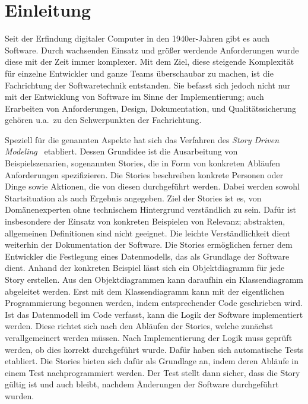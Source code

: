 \chapter{Einleitung}\label{ch:introduction}

Seit der Erfindung digitaler Computer in den 1940er-Jahren gibt es auch Software.
Durch wachsenden Einsatz und größer werdende Anforderungen wurde diese mit der Zeit immer komplexer.
Mit dem Ziel, diese steigende Komplexität für einzelne Entwickler und ganze Teams überschaubar zu machen, ist die Fachrichtung der Softwaretechnik entstanden.
Sie befasst sich jedoch nicht nur mit der Entwicklung von Software im Sinne der Implementierung;
auch Erarbeiten von Anforderungen, Design, Dokumentation, und Qualitätssicherung gehören u.a.\ zu den Schwerpunkten der Fachrichtung.

Speziell für die genannten Aspekte hat sich das Verfahren des \emph{Story Driven Modeling}~\cite{sdm} etabliert.
Dessen Grundidee ist die Ausarbeitung von Beispielszenarien, sogenannten Stories, die in Form von konkreten Abläufen Anforderungen spezifizieren.
Die Stories beschreiben konkrete Personen oder Dinge sowie Aktionen, die von diesen durchgeführt werden.
Dabei werden sowohl Startsituation als auch Ergebnis angegeben.
Ziel der Stories ist es, von Domänenexperten ohne technischem Hintergrund verständlich zu sein.
Dafür ist insbesondere der Einsatz von konkreten Beispielen von Relevanz;
abstrakten, allgemeinen Definitionen sind nicht geeignet.
Die leichte Verständlichkeit dient weiterhin der Dokumentation der Software.
Die Stories ermöglichen ferner dem Entwickler die Festlegung eines Datenmodells, das als Grundlage der Software dient.
Anhand der konkreten Beispiel lässt sich ein Objektdiagramm für jede Story erstellen.
Aus den Objektdiagrammen kann daraufhin ein Klassendiagramm abgeleitet werden.
Erst mit dem Klassendiagramm kann mit der eigentlichen Programmierung begonnen werden, indem entsprechender Code geschrieben wird.
Ist das Datenmodell im Code verfasst, kann die Logik der Software implementiert werden.
Diese richtet sich nach den Abläufen der Stories, welche zunächst verallgemeinert werden müssen.
Nach Implementierung der Logik muss geprüft werden, ob dies korrekt durchgeführt wurde.
Dafür haben sich automatische Tests etabliert.
Die Stories bieten sich dafür als Grundlage an, indem deren Abläufe in einem Test nachprogrammiert werden.
Der Test stellt dann sicher, dass die Story gültig ist und auch bleibt, nachdem Änderungen der Software durchgeführt wurden.

